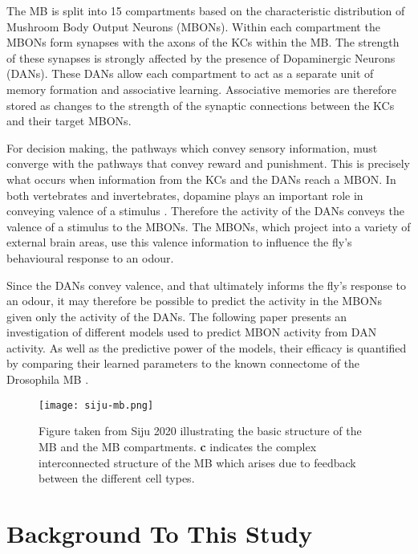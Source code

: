 \documentclass[11pt, A4]{article}
\begin{document}
\begin{multicols}{2}
The MB is split into 15 compartments  \cite{aso2014neuronal, li2020connectome} based on the characteristic distribution of Mushroom Body Output Neurons (MBONs). Within each compartment the MBONs form synapses with the axons of the KCs within the MB. The strength of these synapses is strongly affected by the presence of Dopaminergic Neurons (DANs). These DANs allow each compartment to act as a separate unit of memory formation and associative learning. Associative memories are therefore stored as changes to the strength of the synaptic connections between the KCs and their target MBONs. 

For decision making, the pathways which convey sensory information, must converge with the pathways that convey reward and punishment. This is precisely what occurs when information from the KCs and the DANs reach a MBON. In both vertebrates and invertebrates, dopamine plays an important role in conveying valence of a stimulus \cite{li2020connectome}. Therefore the activity of the DANs conveys the valence of a stimulus to the MBONs. The MBONs, which project into a variety of external brain areas, use this valence information to influence the fly's behavioural response to an odour. 

 Since the DANs convey valence, and that ultimately informs the fly's response to an odour, it may therefore be possible to predict the activity in the MBONs given only the activity of the DANs. The following paper presents an investigation of different models used to predict MBON activity from DAN activity. As well as the predictive power of the models, their efficacy is quantified by comparing their learned  parameters to the known connectome of the Drosophila MB \cite{li2020connectome}.




\begin{figure*}[t]
	\centering
	\texttt{[image: siju-mb.png]}
	\caption{Figure taken from Siju 2020 illustrating the basic structure of the MB and the MB compartments. \textbf{c} indicates the complex interconnected structure of the MB which arises due to feedback between the different cell types.}
	\label{fig:siju-mb}
\end{figure*}

\section{Background To This Study}


\end{multicols}
\end{document}
